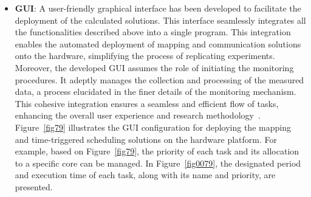 \begin{itemize}
    
    \item \textbf{GUI}: 
         A user-friendly graphical interface has been developed to facilitate the deployment of the calculated solutions. This interface seamlessly integrates all the functionalities described above into a single program. This integration enables the automated deployment of mapping and communication solutions onto the hardware, simplifying the process of replicating experiments. Moreover, the developed GUI assumes the role of initiating the monitoring procedures. It adeptly manages the collection and processing of the measured data, a process elucidated in the finer details of the monitoring mechanism. This cohesive integration ensures a seamless and efficient flow of tasks, enhancing the overall user experience and research methodology~\cite{askaripoor2023designer, askaripoor2021flexible}. Figure~\ref{fig79} illustrates the GUI configuration for deploying the mapping and time-triggered scheduling solutions on the hardware platform.
         For example, based on Figure~\ref{fig79}, the priority of each task and its allocation to a specific core can be managed. In Figure~\ref{fig0079}, the designated period and execution time of each task, along with its name and priority, are presented.
    
    
    \end{itemize}





 






